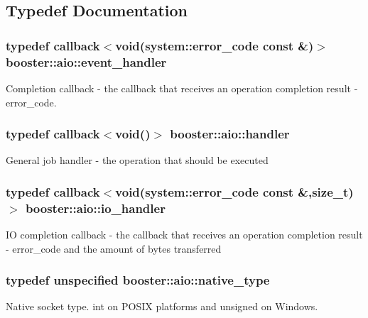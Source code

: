 \subsection{Typedef Documentation}
\subsubsection[{event\-\_\-handler}]{\setlength{\rightskip}{0pt plus 5cm}typedef {\bf callback}$<$void({\bf system\-::error\-\_\-code} const \&)$>$ {\bf booster\-::aio\-::event\-\_\-handler}}\label{namespacebooster_1_1aio_a6f0da1262eee438aff012673690a0930}
Completion callback -\/ the callback that receives an operation completion result -\/ error\-\_\-code. 
\subsubsection[{handler}]{\setlength{\rightskip}{0pt plus 5cm}typedef {\bf callback}$<$void()$>$ {\bf booster\-::aio\-::handler}}\label{namespacebooster_1_1aio_ab53e9a02670be9c7c93a1b54cec00c97}
General job handler -\/ the operation that should be executed 
\subsubsection[{io\-\_\-handler}]{\setlength{\rightskip}{0pt plus 5cm}typedef {\bf callback}$<$void({\bf system\-::error\-\_\-code} const \&,size\-\_\-t)$>$ {\bf booster\-::aio\-::io\-\_\-handler}}\label{namespacebooster_1_1aio_ade0aeea672877a3dde3b8ce4b9ac34e5}
I\-O completion callback -\/ the callback that receives an operation completion result -\/ error\-\_\-code and the amount of bytes transferred 
\subsubsection[{native\-\_\-type}]{\setlength{\rightskip}{0pt plus 5cm}typedef unspecified {\bf booster\-::aio\-::native\-\_\-type}}\label{namespacebooster_1_1aio_ae7a1db68591232cb0423fbdf7924a204}
Native socket type. int on P\-O\-S\-I\-X platforms and unsigned on Windows. 

